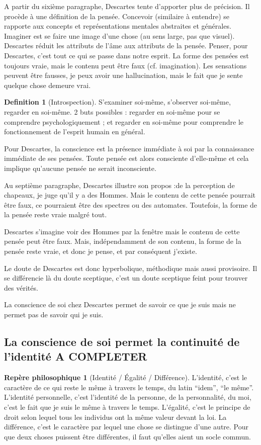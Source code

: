 \documentclass[french]{book}
\theoremstyle{definition}
\newtheorem*{dfn}{Definition}
\newtheorem*{rep}{Repère philosophique}
\begin{document}
A partir du sixième paragraphe, Descartes tente d’apporter plus de précision. Il procède à une définition de la pensée.
Concevoir (similaire à entendre) se rapporte aux concepts et représentations mentales abstraites et générales.
Imaginer est se faire une image d’une chose (au sens large, pas que visuel).
Descartes réduit les attributs de l’âme aux attributs de la pensée. Penser, pour Descartes, c’est tout ce qui se passe dans notre esprit. La forme des pensées est toujours vraie, mais le contenu peut être faux (cf. imagination). Les sensations peuvent être fausses, je peux avoir une hallucination, mais le fait que je sente quelque chose demeure vrai.

\begin{dfn}[Introspection]
S’examiner soi-même, s’observer soi-même, regarder en soi-même. 2 buts possibles : regarder en soi-même pour se comprendre psychologiquement ; et regarder en soi-même pour comprendre le fonctionnement de l'esprit humain en général.
\end{dfn}


Pour Descartes, la conscience est la présence immédiate à soi par la connaissance immédiate de ses pensées. Toute pensée est alors consciente d’elle-même et cela implique qu’aucune pensée ne serait inconsciente.

Au septième paragraphe, Descartes illustre son propos :de la perception de chapeaux, je juge qu’il y a des Hommes. Mais le contenu de cette pensée pourrait être faux, ce pourraient être des spectres ou des automates. Toutefois, la forme de la pensée reste vraie malgré tout.

Descartes s’imagine voir des Hommes par la fenêtre mais le contenu de cette pensée peut être faux. Mais, indépendamment de son contenu, la forme de la pensée reste vraie, et donc je pense, et par conséquent j’existe.

Le doute de Descartes est donc hyperbolique, méthodique mais aussi provisoire. Il se différencie là du doute sceptique, c’est un doute sceptique feint pour trouver des vérités.

La conscience de soi chez Descartes permet de savoir ce que je suis mais ne permet pas de savoir qui je suis.

\subsection{La conscience de soi permet la continuité de l’identité A COMPLETER}

\begin{rep}[Identité / Égalité / Différence]
L’identité, c’est le caractère de ce qui reste le même à travers le temps, du latin “idem”, “le même”. L’identité personnelle, c’est l’identité de la personne, de la personnalité, du moi, c’est le fait que je suis le même à travers le temps.
L’égalité, c’est le principe de droit selon lequel tous les individus ont la même valeur devant la loi.
La différence, c’est le caractère par lequel une chose se distingue d’une autre. Pour que deux choses puissent être différentes, il faut qu’elles aient un socle commun.
\end{rep}
\end{document}
